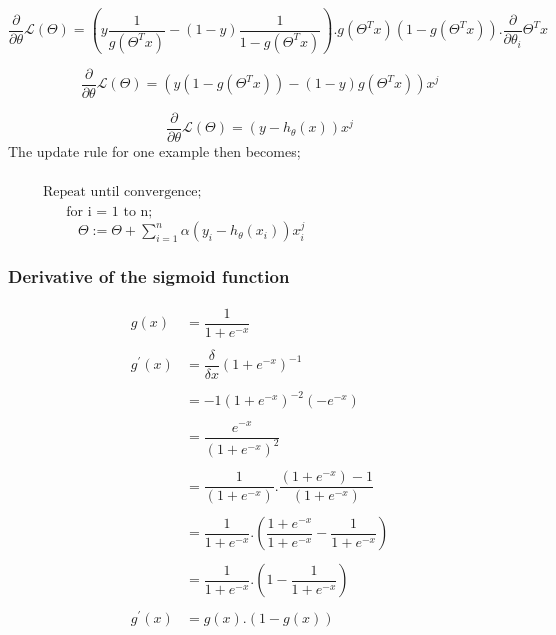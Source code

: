 \documentclass[12pt,a4paper,titlepage,landscape]{book}
\begin{document}
	$$\dfrac{\partial}{\partial\theta}\mathcal{L}(\Theta) = \left(y\dfrac{1}{g(\Theta^Tx)} - (1-y)\dfrac{1}{1-g(\Theta^Tx)}\right).g\left(\Theta^Tx\right)\left(1-g(\Theta^Tx)\right).\dfrac{\partial}{\partial\theta_i}\Theta^Tx$$
	
	$$\dfrac{\partial}{\partial\theta}\mathcal{L}(\Theta) = \left(y(1-g(\Theta^Tx)) - (1-y)g(\Theta^Tx)\right)x^j$$
	
	$$\dfrac{\partial}{\partial\theta}\mathcal{L}(\Theta) = (y-h_\theta(x))x^j$$
	The update rule for one example then becomes; \\\\
	${}\hspace{30pt} \text{Repeat until convergence;} $\\
	${}\hspace{50pt} \text{for i = 1 to n;} $\\
	${}\hspace{60pt} \Theta := \Theta + \sum_{i=1}^{n}\alpha (y_i - h_\theta(x_i))x_i^j$\\
	
	\subsubsection{Derivative of the sigmoid function}
	
	\begin{equation*}
	\begin{array}{cl}
		g(x) &= \dfrac{1}{1+e^{-x}} \\\\
		g^{'}(x) &= \dfrac{\delta}{\delta{x}} \left(1 + e^{-x}\right)^{-1} \\\\
		&= -1(1+e^{-x})^{-2}(-e^{-x}) \\\\
		&= \dfrac{e^{-x}}{\left(1+e^{-x}\right)^2} \\\\
		&= \dfrac{1}{\left(1+e^{-x}\right)}.\dfrac{(1+e^{-x})-1}{\left(1+e^{-x}\right)} \\\\
		&= \dfrac{1}{1+e^{-x}}.\left(\dfrac{1+e^{-x}}{1+e^{-x}} - \dfrac{1}{1+e^{-x}}\right) \\
		\\
		&= \dfrac{1}{1+e^{-x}}.\left(1 - \dfrac{1}{1+e^{-x}}\right) \\\\
		g^{'}(x) &= g(x).(1-g(x))
	\end{array}
	\end{equation*}
	
\end{document}
